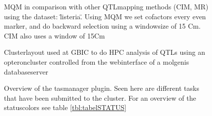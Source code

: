 	\begin{figure}[ht]
	  \hfill
	  \label{fig:FigureListeria}
	  \caption{MQM in comparison with other QTLmapping methods (CIM, MR) using the dataset: \"listeria\". Using MQM we set cofactors every even marker, and do backward selection using a windowsize of 15 Cm. CIM also uses a window of 15Cm}
	\end{figure}
	
	\begin{figure}[ht]
	  \hfill
	  \label{fig:FigureCluster}
	  \caption{Clusterlayout used at GBIC to do HPC analysis of QTLs using an opteroncluster controlled from the webinterface of a molgenis databaseserver}
	\end{figure}
	
	\begin{figure}[ht]
	  \hfill
	  \label{fig:FigureTaskman}
	  \caption{Overview of the tasmanager plugin. Seen here are different tasks that have been submitted to the cluster. For an overview of the statuscolors see table \ref{tbl:tabelSTATUS}}
	\end{figure}
